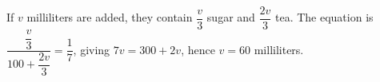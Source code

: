 If $v$ milliliters are added, they contain $\dfrac{v}{3}$ sugar and $\dfrac{2v}{3}$ tea. The equation is $\dfrac{\dfrac{v}{3}}{100+\dfrac{2v}{3}}=\dfrac{1}{7}$, giving $7v=300+2v$, hence $\boxed{v=60}$ milliliters.
